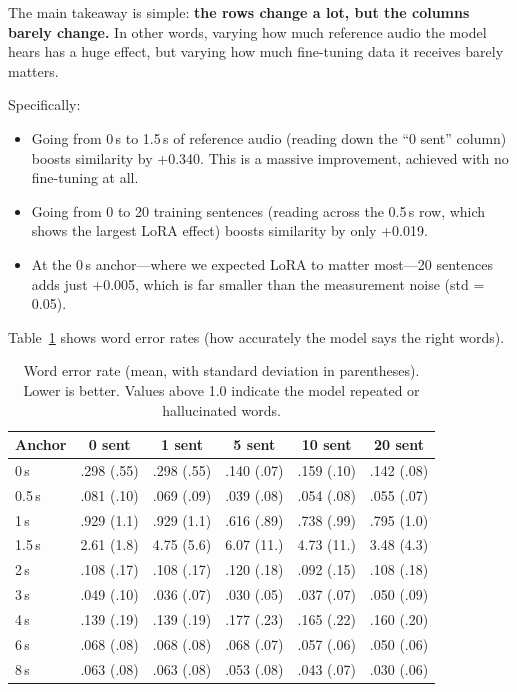 \documentclass[11pt, a4paper]{article}
\begin{document}
The main takeaway is simple: \textbf{the rows change a lot, but the columns barely change.} In other words, varying how much reference audio the model hears has a huge effect, but varying how much fine-tuning data it receives barely matters.

Specifically:
\begin{itemize}[itemsep=2pt]
    \item Going from 0\,s to 1.5\,s of reference audio (reading down the ``0 sent'' column) boosts similarity by +0.340. This is a massive improvement, achieved with no fine-tuning at all.
    \item Going from 0 to 20 training sentences (reading across the 0.5\,s row, which shows the largest LoRA effect) boosts similarity by only +0.019.
    \item At the 0\,s anchor---where we expected LoRA to matter most---20 sentences adds just +0.005, which is far smaller than the measurement noise (std = 0.05).
\end{itemize}

Table~\ref{tab:wer_grid} shows word error rates (how accurately the model says the right words).

\begin{table}[H]
\centering
\caption{Word error rate (mean, with standard deviation in parentheses). Lower is better. Values above 1.0 indicate the model repeated or hallucinated words.}
\label{tab:wer_grid}
\small
\begin{tabular}{@{}l ccccc@{}}
\toprule
\textbf{Anchor} & \textbf{0 sent} & \textbf{1 sent} & \textbf{5 sent} & \textbf{10 sent} & \textbf{20 sent} \\
\midrule
0\,s   & .298 (.55) & .298 (.55) & .140 (.07) & .159 (.10) & .142 (.08) \\
0.5\,s & .081 (.10) & .069 (.09) & .039 (.08) & .054 (.08) & .055 (.07) \\
1\,s   & .929 (1.1) & .929 (1.1) & .616 (.89) & .738 (.99) & .795 (1.0) \\
1.5\,s & 2.61 (1.8) & 4.75 (5.6) & 6.07 (11.) & 4.73 (11.) & 3.48 (4.3) \\
2\,s   & .108 (.17) & .108 (.17) & .120 (.18) & .092 (.15) & .108 (.18) \\
3\,s   & .049 (.10) & .036 (.07) & .030 (.05) & .037 (.07) & .050 (.09) \\
4\,s   & .139 (.19) & .139 (.19) & .177 (.23) & .165 (.22) & .160 (.20) \\
6\,s   & .068 (.08) & .068 (.08) & .068 (.07) & .057 (.06) & .050 (.06) \\
8\,s   & .063 (.08) & .063 (.08) & .053 (.08) & .043 (.07) & .030 (.06) \\
\bottomrule
\end{tabular}
\end{table}
\end{document}
